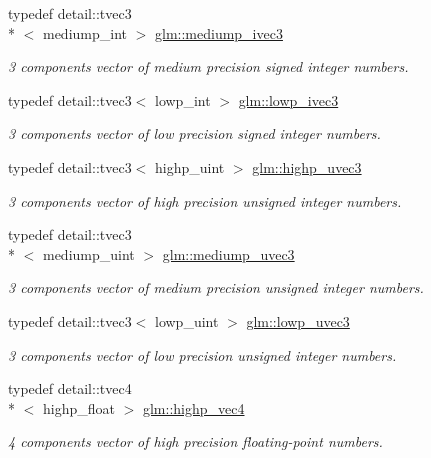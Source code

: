 \begin{DoxyCompactItemize}
typedef detail\-::tvec3\\*
$<$ mediump\-\_\-int $>$ \hyperlink{group__core__precision_gab824e682bc463998efbcd4a512ebf209}{glm\-::mediump\-\_\-ivec3}
\begin{DoxyCompactList}\small\item\em 3 components vector of medium precision signed integer numbers. \end{DoxyCompactList}\item 
typedef detail\-::tvec3$<$ lowp\-\_\-int $>$ \hyperlink{group__core__precision_ga61fed1e59be72903080596ebbaf2fac5}{glm\-::lowp\-\_\-ivec3}
\begin{DoxyCompactList}\small\item\em 3 components vector of low precision signed integer numbers. \end{DoxyCompactList}\item 
typedef detail\-::tvec3$<$ highp\-\_\-uint $>$ \hyperlink{group__core__precision_gade4b43d968dd42ee3215a51de7b86425}{glm\-::highp\-\_\-uvec3}
\begin{DoxyCompactList}\small\item\em 3 components vector of high precision unsigned integer numbers. \end{DoxyCompactList}\item 
typedef detail\-::tvec3\\*
$<$ mediump\-\_\-uint $>$ \hyperlink{group__core__precision_gaa69cb8ff23d5c3daa3cf320136ac8e7d}{glm\-::mediump\-\_\-uvec3}
\begin{DoxyCompactList}\small\item\em 3 components vector of medium precision unsigned integer numbers. \end{DoxyCompactList}\item 
typedef detail\-::tvec3$<$ lowp\-\_\-uint $>$ \hyperlink{group__core__precision_ga45a3d9b09e9077ea280d8a1d599c7cae}{glm\-::lowp\-\_\-uvec3}
\begin{DoxyCompactList}\small\item\em 3 components vector of low precision unsigned integer numbers. \end{DoxyCompactList}\item 
typedef detail\-::tvec4\\*
$<$ highp\-\_\-float $>$ \hyperlink{group__core__precision_ga78dab0bca921cd9a1e1206ee3cf01207}{glm\-::highp\-\_\-vec4}
\begin{DoxyCompactList}\small\item\em 4 components vector of high precision floating-\/point numbers. \end{DoxyCompactList}\item 

\end{DoxyCompactItemize}
